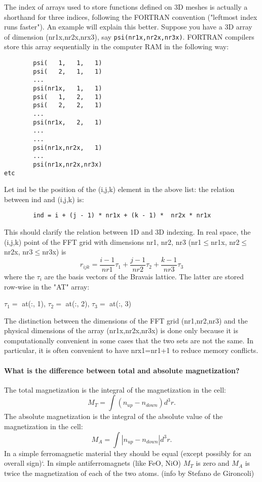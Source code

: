 \documentclass[12pt,a4paper]{article}
\begin{document}
The index of arrays used to store functions defined on 3D meshes is
actually a shorthand for three indices, following the FORTRAN convention 
("leftmost index runs faster"). An example will explain this better. 
Suppose you have a 3D array of dimension (nr1x,nr2x,nrx3), say 
\texttt{psi(nr1x,nr2x,nr3x)}. FORTRAN compilers store this array sequentially 
in the computer RAM in the following way:
\begin{verbatim}
        psi(   1,   1,   1)
        psi(   2,   1,   1)
        ...
        psi(nr1x,   1,   1)
        psi(   1,   2,   1)
        psi(   2,   2,   1)
        ...
        psi(nr1x,   2,   1)
        ...
        ...
        psi(nr1x,nr2x,   1)
        ...
        psi(nr1x,nr2x,nr3x)
etc
\end{verbatim}
Let ind be the position of the (i,j,k) element in the above list: the
relation between ind and (i,j,k) is:
\begin{verbatim}
        ind = i + (j - 1) * nr1x + (k - 1) *  nr2x * nr1x
\end{verbatim}
This should clarify the relation between 1D and 3D indexing. In real
space, the (i,j,k) point of the FFT grid with dimensions nr1, nr2, nr3
(nr1$\le$nr1x, nr2$\le$nr2x, nr3$\le$nr3x) is
$$
r_{ijk}=\frac{i-1}{nr1} \tau_1  +  \frac{j-1}{nr2} \tau_2 +
\frac{k-1}{nr3} \tau_3 
$$
where the $\tau_i$ are the basis vectors of the Bravais lattice. 
The latter are stored row-wise in the "AT" array:

$\tau_1 = $ at(:, 1), $\tau_2 = $ at(:, 2), $\tau_3 = $ at(:, 3)

The distinction between the dimensions of the FFT grid
(nr1,nr2,nr3) and the physical dimensions of the array
(nr1x,nr2x,nr3x) is done only because it is computationally
convenient in some cases that the two sets are not the same.
In particular, it is often convenient to have nrx1=nr1+1
to reduce memory conflicts.

\paragraph{What is the difference between total and absolute magnetization?}

The total magnetization is the integral of the magnetization
in the cell: 
$$
M_T = \int (n_{up}-n_{down}) d^3r.
$$
The absolute magnetization is the integral of the absolute value of
the magnetization in the cell:
$$
M_A= \int |n_{up}-n_{down}| d^3r.
$$
In a simple ferromagnetic material they should be equal (except
possibly for an overall sign)`. In simple antiferromagnets (like FeO,
NiO) $M_T$ is zero and $M_A$ is twice the magnetization of each of the
two atoms. (info by Stefano de Gironcoli) 
\end{document}
